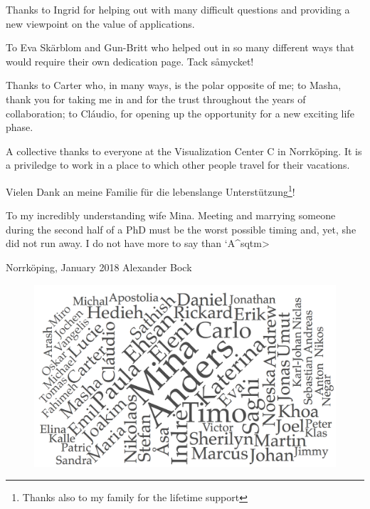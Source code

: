 Thanks to Ingrid for helping out with many difficult questions and providing a new viewpoint on the value of applications.

To Eva Sk\"arblom and Gun-Britt who helped out in so many different ways that would require their own dedication page.  Tack s\aa mycket!

Thanks to Carter who, in many ways, is the polar opposite of me;  to Masha, thank you for taking me in and for the trust throughout the years of collaboration;  to Cl\'audio, for opening up the opportunity for a new exciting life phase.

A collective thanks to everyone at the Visualization Center C in Norrk\"oping.  It is a priviledge to work in a place to which other people travel for their vacations.


Vielen Dank an meine Familie f\"ur die lebenslange Unterst\"utzung\footnote{Thanks also to my family for the lifetime support}!

To my incredibly understanding wife Mina.  Meeting and marrying someone during the second half of a PhD must be the worst possible timing and, yet, she did not run away.  I do not have more to say than \<`A^sqtm>

\vspace{1cm}
\hrulefill
\hrulefill

Norrk\"oping, January 2018 \hfill Alexander Bock

\vfill

\begin{figure}[hb]
\centering
\includegraphics[width=0.75\linewidth]{figures/misc/wordcloud.png}
\end{figure}

